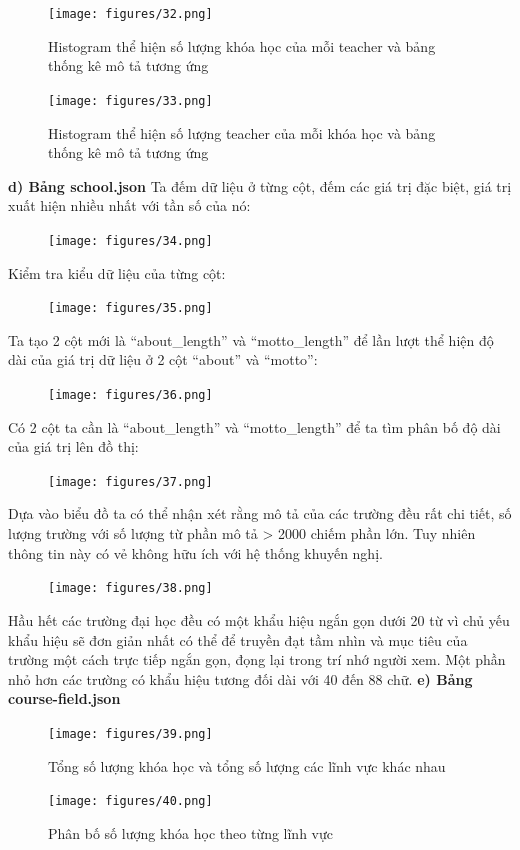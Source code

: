 \begin{figure}[H]
    \centering
    \texttt{[image: figures/32.png]}
    \caption{Histogram thể hiện số lượng khóa học của mỗi teacher và bảng thống kê mô tả tương ứng}
\end{figure}
\newpage
\begin{figure}[H]
    \centering
    \texttt{[image: figures/33.png]}
    \caption{Histogram thể hiện số lượng teacher của mỗi khóa học và bảng thống kê mô tả tương ứng}
\end{figure}
\textbf{d) Bảng school.json}
Ta đếm dữ liệu ở từng cột, đếm các giá trị đặc biệt, giá trị xuất hiện nhiều nhất với tần số của nó:
\begin{figure}[H]
    \centering
    \texttt{[image: figures/34.png]}
\end{figure}
Kiểm tra kiểu dữ liệu của từng cột: 
\newpage
\begin{figure}[H]
    \centering
    \texttt{[image: figures/35.png]}
\end{figure}
Ta tạo 2 cột mới là “about\_length” và “motto\_length” để lần lượt thể hiện độ dài của giá trị dữ liệu ở 2 cột “about” và “motto”:
\begin{figure}[H]
    \centering
    \texttt{[image: figures/36.png]}
\end{figure}
\newpage
Có 2 cột ta cần là “about\_length” và “motto\_length” để ta tìm phân bố độ dài của giá trị lên đồ thị:
\begin{figure}[H]
    \centering
    \texttt{[image: figures/37.png]}
\end{figure}
Dựa vào biểu đồ ta có thể nhận xét rằng mô tả của các trường đều rất chi tiết, số lượng trường với số lượng từ phần mô tả > 2000  chiếm phần lớn. Tuy nhiên thông tin này có vẻ không hữu ích với hệ thống khuyến nghị.
\begin{figure}[H]
    \centering
    \texttt{[image: figures/38.png]}
\end{figure}
Hầu hết các trường đại học đều có một khẩu hiệu ngắn gọn dưới 20 từ vì chủ yếu khẩu hiệu sẽ đơn giản nhất có thể để truyền đạt tầm nhìn và mục tiêu của trường một cách trực tiếp ngắn gọn, đọng lại trong trí nhớ người xem. Một phần nhỏ hơn các trường có khẩu hiệu tương đối dài với 40 đến 88 chữ. 
\newpage
\textbf{e) Bảng course-field.json}
\begin{figure}[H]
    \centering
    \texttt{[image: figures/39.png]}
    \caption{Tổng số lượng khóa học và tổng số lượng các lĩnh vực khác nhau}
\end{figure}
\begin{figure}[H]
    \centering
    \texttt{[image: figures/40.png]}
    \caption{Phân bố số lượng khóa học theo từng lĩnh vực}
\end{figure}
